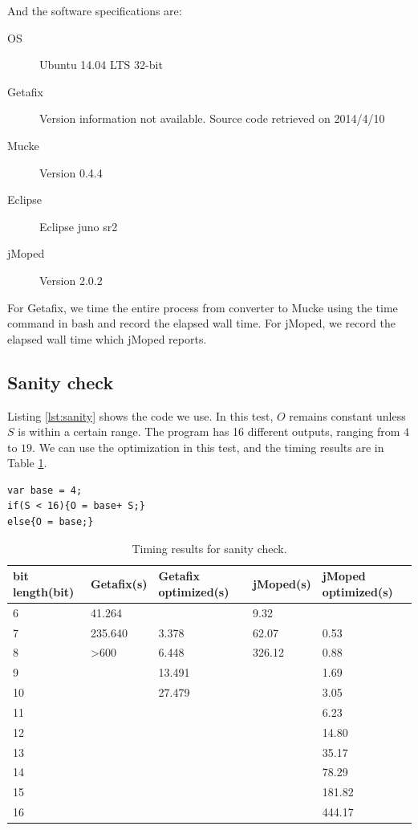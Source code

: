 And the software specifications are:
\begin{description}
  \item[OS] Ubuntu 14.04 LTS 32-bit
  \item[Getafix] Version information not available. Source code retrieved on 2014/4/10
  \item[Mucke] Version 0.4.4
  \item[Eclipse] Eclipse juno sr2
  \item[jMoped] Version 2.0.2
\end{description}

For Getafix, we time the entire process from converter to Mucke using the time command in bash and record the elapsed wall time. For jMoped, we record the elapsed wall time which jMoped reports.

\subsection{Sanity check}
Listing \ref{lst:sanity} shows the code we use. In this test, $O$ remains constant unless $S$ is within a certain range. The program has 16 different outputs, ranging from $4$ to $19$. We can use the optimization in this test, and the timing results are in Table \ref{tbl:sanity}.

\lstset{language=C}  
\begin{lstlisting}[float=!h, caption={Sanity check test program.},label=lst:sanity]
var base = 4;
if(S < 16){O = base+ S;}
else{O = base;}
\end{lstlisting}

\begin{table}[!h]
\begin{center}
\begin{tabular}{|l|l|l|l|l|}
\hline
bit length(bit) & Getafix(s) & Getafix optimized(s) & jMoped(s) & jMoped optimized(s) \\ \hline
6 & 41.264 &  & 9.32 &  \\ \hline
7 & 235.640 & 3.378 & 62.07 & 0.53 \\ \hline
8 & \textgreater600 & 6.448 & 326.12 & 0.88 \\ \hline
9 &  & 13.491 &  & 1.69 \\ \hline
10 &  & 27.479 &  & 3.05 \\ \hline
11 &  &  &  & 6.23 \\ \hline
12 &  &  &  & 14.80 \\ \hline
13 &  &  &  & 35.17 \\ \hline
14 &  &  &  & 78.29 \\ \hline
15 &  &  &  & 181.82 \\ \hline
16 &  &  &  & 444.17 \\ \hline
\end{tabular}
\end{center}
\caption{Timing results for sanity check.}
\label{tbl:sanity}
\end{table}

